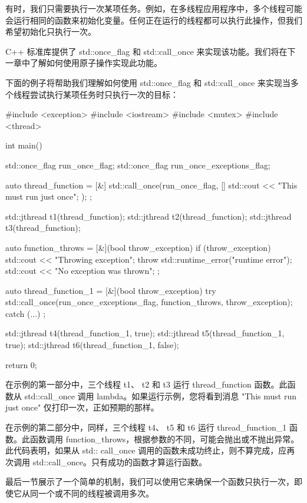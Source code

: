 有时，我们只需要执行一次某项任务。例如，在多线程应用程序中，多个线程可能会运行相同的函数来初始化变量。任何正在运行的线程都可以执行此操作，但我们希望初始化只执行一次。

C++ 标准库提供了 std::once\_flag 和 std::call\_once 来实现该功能。我们将在下一章中了解如何使用原子操作实现此功能。

下面的例子将帮助我们理解如何使用 std::once\_flag 和 std::call\_once 来实现当多个线程尝试执行某项任务时只执行一次的目标：

\begin{cpp}
#include <exception>
#include <iostream>
#include <mutex>
#include <thread>

int main() {
    std::once_flag run_once_flag;
    std::once_flag run_once_exceptions_flag;

    auto thread_function = [&] {
        std::call_once(run_once_flag, []{
            std::cout << "This must run just once\n";
        });
    };

    std::jthread t1(thread_function);
    std::jthread t2(thread_function);
    std::jthread t3(thread_function);

    auto function_throws = [&](bool throw_exception) {
        if (throw_exception) {
            std::cout << "Throwing exception\n";
            throw std::runtime_error("runtime error");
        }
        std::cout << "No exception was thrown\n";
    };

    auto thread_function_1 = [&](bool throw_exception) {
        try {
            std::call_once(run_once_exceptions_flag,
            function_throws,
            throw_exception);
        }
        catch (...) {
        }
    };

    std::jthread t4(thread_function_1, true);
    std::jthread t5(thread_function_1, true);
    std::jthread t6(thread_function_1, false);

    return 0;
}
\end{cpp}

在示例的第一部分中，三个线程 t1、 t2 和 t3 运行 thread\_function 函数。此函数从 std::call\_once 调用 lambda。如果运行示例，您将看到消息 "This must run just once" 仅打印一次，正如预期的那样。

在示例的第二部分中，同样，三个线程 t4、 t5 和 t6 运行 thread\_function\_1 函数。此函数调用 function\_throws，根据参数的不同，可能会抛出或不抛出异常。此代码表明，如果从 std:: call\_once 调用的函数未成功终止，则不算完成，应再次调用 std::call\_once。只有成功的函数才算运行函数。

最后一节展示了一个简单的机制，我们可以使用它来确保一个函数只执行一次，即使它从同一个或不同的线程被调用多次。








































